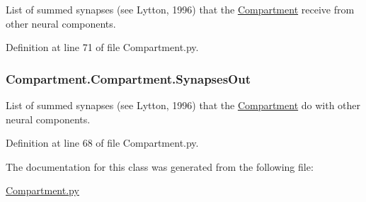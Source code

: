 List of summed synapses (see Lytton, 1996) that the \hyperlink{class_compartment_1_1_compartment}{Compartment} receive from other neural components. 



Definition at line 71 of file Compartment.\-py.

\hypertarget{class_compartment_1_1_compartment_a85d64ebf548276c873501d2dc3489ceb}{
\subsubsection[{Synapses\-Out}]{\setlength{\rightskip}{0pt plus 5cm}Compartment.\-Compartment.\-Synapses\-Out}}\label{class_compartment_1_1_compartment_a85d64ebf548276c873501d2dc3489ceb}


List of summed synapses (see Lytton, 1996) that the \hyperlink{class_compartment_1_1_compartment}{Compartment} do with other neural components. 



Definition at line 68 of file Compartment.\-py.



The documentation for this class was generated from the following file\-:\begin{DoxyCompactItemize}
\item 
\hyperlink{_compartment_8py}{Compartment.\-py}\end{DoxyCompactItemize}
